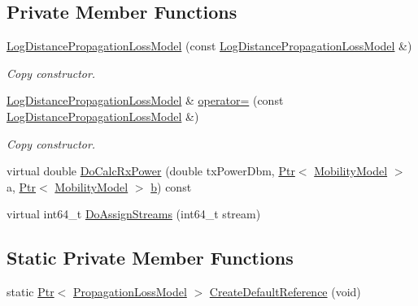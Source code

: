 \subsection*{Private Member Functions}
\begin{DoxyCompactItemize}
\item 
\hyperlink{classns3_1_1LogDistancePropagationLossModel_ad285db6bdd6cf48e302f563321983dc8}{Log\+Distance\+Propagation\+Loss\+Model} (const \hyperlink{classns3_1_1LogDistancePropagationLossModel}{Log\+Distance\+Propagation\+Loss\+Model} \&)
\begin{DoxyCompactList}\small\item\em Copy constructor. \end{DoxyCompactList}\item 
\hyperlink{classns3_1_1LogDistancePropagationLossModel}{Log\+Distance\+Propagation\+Loss\+Model} \& \hyperlink{classns3_1_1LogDistancePropagationLossModel_a0903dc8454d4e8bbd605efb7c56f1bcc}{operator=} (const \hyperlink{classns3_1_1LogDistancePropagationLossModel}{Log\+Distance\+Propagation\+Loss\+Model} \&)
\begin{DoxyCompactList}\small\item\em Copy constructor. \end{DoxyCompactList}\item 
virtual double \hyperlink{classns3_1_1LogDistancePropagationLossModel_acf6fa322564f60f5140b3e6cc7910581}{Do\+Calc\+Rx\+Power} (double tx\+Power\+Dbm, \hyperlink{classns3_1_1Ptr}{Ptr}$<$ \hyperlink{classns3_1_1MobilityModel}{Mobility\+Model} $>$ a, \hyperlink{classns3_1_1Ptr}{Ptr}$<$ \hyperlink{classns3_1_1MobilityModel}{Mobility\+Model} $>$ \hyperlink{lte__pathloss_8m_a21ad0bd836b90d08f4cf640b4c298e7c}{b}) const 
\item 
virtual int64\+\_\+t \hyperlink{classns3_1_1LogDistancePropagationLossModel_a6135eec15e56f3193fe8bc79ccd8bb5e}{Do\+Assign\+Streams} (int64\+\_\+t stream)
\end{DoxyCompactItemize}
\subsection*{Static Private Member Functions}
\begin{DoxyCompactItemize}
\item 
static \hyperlink{classns3_1_1Ptr}{Ptr}$<$ \hyperlink{classns3_1_1PropagationLossModel}{Propagation\+Loss\+Model} $>$ \hyperlink{classns3_1_1LogDistancePropagationLossModel_a100631298bb0d7810be6b970288cfcc5}{Create\+Default\+Reference} (void)
\end{DoxyCompactItemize}
